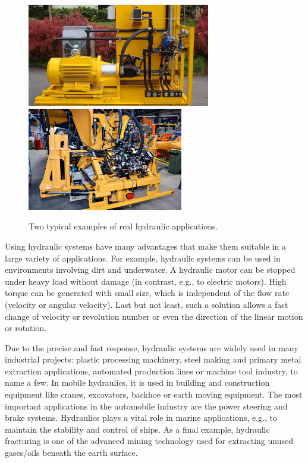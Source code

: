 \begin{figure}[ht!]
	\centering
		\includegraphics[height=4.5cm]{PositiveDisplacementPumps/Figures/Example_Of_Hydraulic_System_1.jpg}
		\includegraphics[height=4.5cm]{PositiveDisplacementPumps/Figures/Example_Of_Hydraulic_System_2.jpg}
	\caption{Two typical examples of real hydraulic applications.}
	\label{Fig:Examples_of_hydraulic_systems}
\end{figure}

Using hydraulic systems have many advantages that make them suitable in a large variety of applications. For example, hydraulic systems can be used in environments involving dirt and underwater. A hydraulic motor can be stopped under heavy load without damage (in contrast, e.g., to electric motors). High torque can be generated with small size, which is independent of the flow rate (velocity or angular velocity). Last but not least, such a solution allows a fast change of velocity or revolution number or even the direction of the linear motion or rotation.

Due to the precise and fast response, hydraulic systems are widely used in many industrial projects: plastic processing machinery, steel making and primary metal extraction applications, automated production lines or machine tool industry, to name a few. In mobile hydraulics, it is used in building and construction equipment like cranes, excavators, backhoe or earth moving equipment. The most important applications in the automobile industry are the power steering and brake systems. Hydraulics plays a vital role in marine applications, e.g., to maintain the stability and control of ships. As a final example, hydraulic fracturing is one of the advanced mining technology used for extracting unused gases/oils beneath the earth surface.

